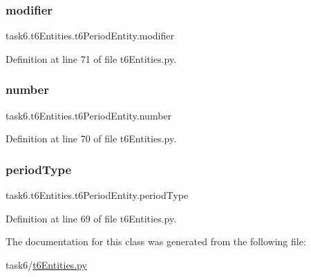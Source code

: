 \subsubsection{\texorpdfstring{modifier}{modifier}}
{\footnotesize\ttfamily task6.\+t6\+Entities.\+t6\+Period\+Entity.\+modifier}



Definition at line 71 of file t6\+Entities.\+py.

\mbox{\label{classtask6_1_1t6Entities_1_1t6PeriodEntity_a2cc588afdfc2e867cc652ef821015990}} 
\subsubsection{\texorpdfstring{number}{number}}
{\footnotesize\ttfamily task6.\+t6\+Entities.\+t6\+Period\+Entity.\+number}



Definition at line 70 of file t6\+Entities.\+py.

\mbox{\label{classtask6_1_1t6Entities_1_1t6PeriodEntity_ae2f4d463fe5601083ce5ce3070690f1d}} 
\subsubsection{\texorpdfstring{period\+Type}{periodType}}
{\footnotesize\ttfamily task6.\+t6\+Entities.\+t6\+Period\+Entity.\+period\+Type}



Definition at line 69 of file t6\+Entities.\+py.



The documentation for this class was generated from the following file\+:\begin{DoxyCompactItemize}
\item 
task6/\hyperlink{t6Entities_8py}{t6\+Entities.\+py}\end{DoxyCompactItemize}
